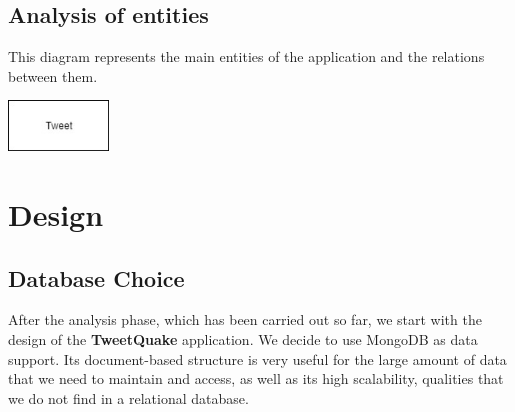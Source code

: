 \documentclass[a4paper, oneside]{article}
\begin{document}
\subsection{Analysis of entities}
This diagram represents the main entities of the application and the relations between them.
\begin{minipage}{\linewidth}
\begin{center}
\vspace{4mm}
\includegraphics[width = 0.2\textwidth]{./images/diagrams/Uml Analysis diagram} 
\vspace{2mm}
\label{fig:useCases}
\end{center}
\end{minipage}



\clearpage
\section{Design}

\subsection{Database Choice}
After the analysis phase, which has been carried out so far, we start with the design of the \textbf{TweetQuake} application. We decide to use MongoDB as data support. Its document-based structure is very useful for the large amount of data that we need to maintain and access, as well as its high scalability, qualities that we do not find in a relational database.
\end{document}
